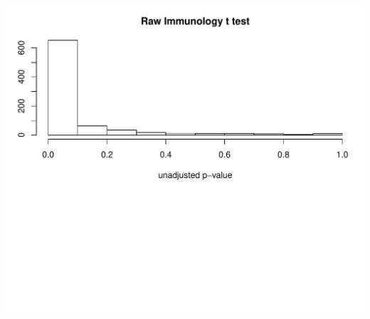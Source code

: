 \documentclass{article}\usepackage[]{graphicx}\usepackage[]{color}
\makeatletter
\def\maxwidth{ %
  \ifdim\Gin@nat@width>\linewidth
    \linewidth
  \else
    \Gin@nat@width
  \fi
}
\makeatother
\begin{document}
\begin{Schunk}
{\centering \includegraphics[width=\maxwidth]{figure/Nov_3_gene_list_and_testing-3} 

}

\end{Schunk}
\end{document}
